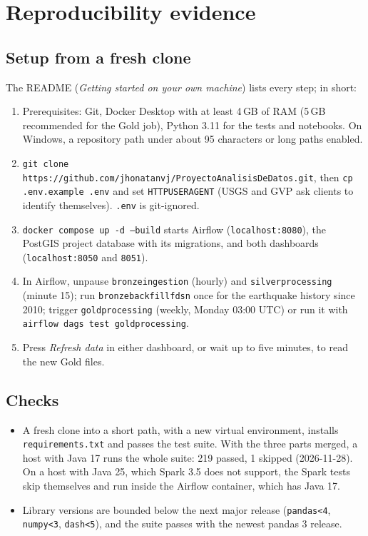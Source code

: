 \documentclass[11pt,a4paper]{article}
\renewcommand{\_}{\textunderscore\allowbreak}
\begin{document}
\section{Reproducibility evidence}\label{sec:reproducibility}

\subsection{Setup from a fresh clone}
The README (\emph{Getting started on your own machine}) lists every step; in short:
\begin{enumerate}
  \item Prerequisites: Git, Docker Desktop with at least 4\,GB of RAM (5\,GB recommended for the Gold
        job), Python 3.11 for the tests and notebooks. On Windows, a repository path under about 95
        characters or long paths enabled.
  \item \texttt{git clone https://github.com/jhonatanvj/Proyecto\_Analisis\_De\_Datos.git}, then
        \texttt{cp .env.example .env} and set \texttt{HTTP\_USER\_AGENT} (USGS and GVP ask clients to
        identify themselves). \texttt{.env} is git-ignored.
  \item \texttt{docker compose up -d --build} starts Airflow (\texttt{localhost:8080}), the PostGIS
        project database with its migrations, and both dashboards (\texttt{localhost:8050} and
        \texttt{8051}).
  \item In Airflow, unpause \texttt{bronze\_ingestion} (hourly) and \texttt{silver\_processing}
        (minute 15); run \texttt{bronze\_backfill\_fdsn} once for the earthquake history since 2010;
        trigger \texttt{gold\_processing} (weekly, Monday 03:00 UTC) or run it with
        \texttt{airflow dags test gold\_processing}.
  \item Press \emph{Refresh data} in either dashboard, or wait up to five minutes, to read the new Gold
        files.
\end{enumerate}

\subsection{Checks}
\begin{itemize}
  \item A fresh clone into a short path, with a new virtual environment, installs
        \texttt{requirements.txt} and passes the test suite. With the three parts merged, a host with
        Java 17 runs the whole suite: 219 passed, 1 skipped (2026-11-28). On a host with Java 25, which
        Spark 3.5 does not support, the Spark tests skip themselves and run inside the Airflow container,
        which has Java 17.
  \item Library versions are bounded below the next major release (\texttt{pandas<4}, \texttt{numpy<3},
        \texttt{dash<5}), and the suite passes with the newest pandas 3 release.
\end{itemize}
\end{document}
